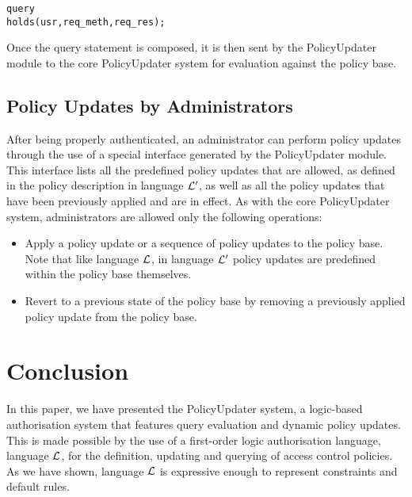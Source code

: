 \documentclass[global,twocolumn,final]{svjour}
\newenvironment{vverbatim}
  {\begin{alltt}}
  {\vspace{-\baselineskip}\end{alltt}}
\begin{document}
      \begin{vverbatim}
  query
    holds(usr, req\_meth, req\_res);
      \end{vverbatim}

      Once the query statement is composed, it is then sent by the
      PolicyUpdater module to the core PolicyUpdater system for evaluation
      against the policy base.

    \subsection{Policy Updates by Administrators}

      After being properly authenticated, an administrator can perform policy
      updates through the use of a special interface generated by the
      PolicyUpdater module. This interface lists all the predefined policy
      updates that are allowed, as defined in the policy description in
      language ${\cal L'}$, as well as all the policy updates that have been
      previously applied and are in effect. As with the core PolicyUpdater
      system, administrators are allowed only the following operations:

      \begin{itemize}
        \item
          Apply a policy update or a sequence of policy updates to the policy
          base. Note that like language ${\cal L}$, in language ${\cal L'}$
          policy updates are predefined within the policy base themselves.
        \item
          Revert to a previous state of the policy base by removing a
          previously applied policy update from the policy base.
      \end{itemize}

  \section{Conclusion}
    \label{sec-conclusion}

    In this paper, we have presented the PolicyUpdater system, a logic-based
    authorisation system that features query evaluation and dynamic policy
    updates. This is made possible by the use of a first-order logic
    authorisation language, language ${\cal L}$, for the definition, updating
    and querying of access control policies. As we have shown, language
    ${\cal L}$ is expressive enough to represent constraints and default rules.
\end{document}
